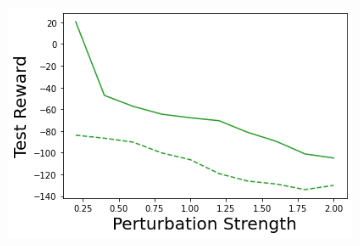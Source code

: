 \begin{figure}
\begin{subfigure}{.24\textwidth}
    \end{subfigure}
    \begin{subfigure}{.24\textwidth}
        \includegraphics[width=\textwidth]{sections/011_icml2022/resources/state_shift-PostNet-LunarLanderShift-v0-mean_reward_.png}
    \end{subfigure}
    

\end{figure}
